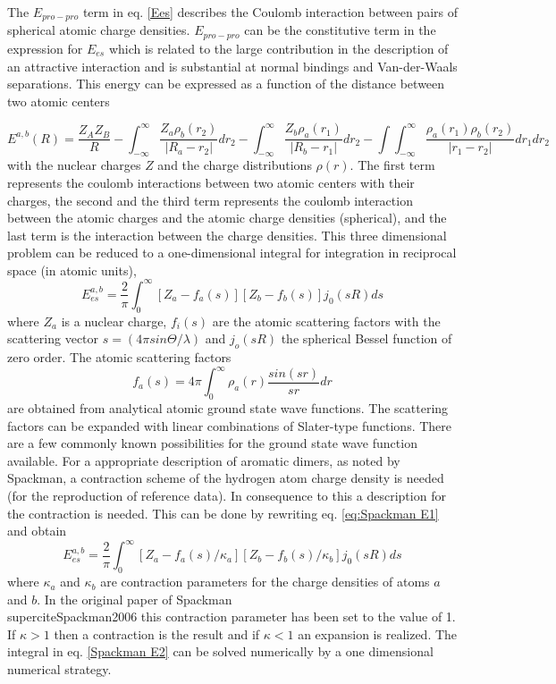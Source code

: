\documentclass[10pt,a4paper]{article} %
\begin{document}
The $E_{pro-pro}$ term in eq. \ref{Ees} describes the Coulomb interaction
between pairs of spherical atomic charge densities. $E_{pro-pro}$
can be the constitutive term in the expression for $E_{es}$ which
is related to the large contribution in the description of an attractive
interaction and is substantial at normal bindings and Van-der-Waals
separations. This energy can be expressed as a function of the distance
between two atomic centers

\begin{equation}
E^{a,b}(R)=\frac{Z_{A}Z_{B}}{R}-\int_{-\infty}^{\infty}\frac{Z_{a}\rho_{b}(r_{2})}{|R_{a}-r_{2}|}dr_{2}-\int_{-\infty}^{\infty}\frac{Z_{b}\rho_{a}(r_{1})}{|R_{b}-r_{1}|}dr_{2}-\int\int_{-\infty}^{\infty}\frac{\rho_{a}(r_{1})\rho_{b}(r_{2})}{|r_{1}-r_{2}|}dr_{1}dr_{2}
\end{equation}
with the nuclear charges $Z$ and the charge distributions $\rho(r)$.
The first term represents the coulomb interactions between two atomic
centers with their charges, the second and the third term represents
the coulomb interaction between the atomic charges and the atomic
charge densities (spherical), and the last term is the interaction
between the charge densities. This three dimensional problem can be
reduced to a one-dimensional integral for integration in reciprocal
space (in atomic units)\supercite{Spackman1986}, 
\begin{equation}
E_{es}^{a,b}=\frac{2}{\pi}\int_{0}^{\infty}[Z_{a}-f_{a}(s)][Z_{b}-f_{b}(s)]j_{0}(sR)ds\label{eq:Spackman E1}
\end{equation}
where $Z_{a}$ is a nuclear charge, $f_{i}(s)$ are the atomic scattering
factors with the scattering vector $s=(4\pi sin\Theta/\lambda)$ and
$j_{o}(sR)$ the spherical Bessel function of zero order\supercite{Tafipolsky2011}.
The atomic scattering factors
\begin{equation}
f_{a}(s)=4\pi\int_{0}^{\infty}\rho_{a}(r)\frac{sin(sr)}{sr}dr
\end{equation}
are obtained from analytical atomic ground state wave functions. The
scattering factors can be expanded with linear combinations of Slater-type
functions. There are a few commonly known possibilities for the ground
state wave function available. For a appropriate description of aromatic
dimers, as noted by Spackman\supercite{Spackman2006}, a contraction scheme
of the hydrogen atom charge density is needed (for the reproduction
of reference data). In consequence to this a description for the contraction
is needed. This can be done by rewriting eq. \ref{eq:Spackman E1}
and obtain
\begin{equation}
E_{es}^{a,b}=\frac{2}{\pi}\int_{0}^{\infty}[Z_{a}-f_{a}(s)/\kappa_{a}][Z_{b}-f_{b}(s)/\kappa_{b}]j_{0}(sR)ds\label{Spackman E2}
\end{equation}
where $\kappa_{a}$ and $\kappa_{b}$ are contraction parameters for
the charge densities of atoms $a$ and $b$. In the original paper
of Spackman \\supercite{Spackman2006} this contraction parameter has been
set to the value of 1. If $\kappa>1$ then a contraction is the result
and if $\kappa<1$ an expansion is realized. The integral in eq. \ref{Spackman E2}
can be solved numerically by a one dimensional numerical strategy.
\end{document}
